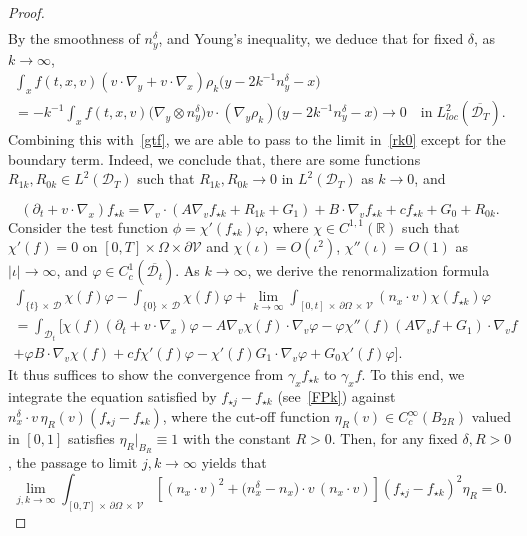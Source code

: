 \documentclass[AHL,Unicode,longabstracts,published]{cedram}
\newcommand*\p{\partial}
\newcommand*\R {\mathbb{R}}
\newcommand*\V {\mathcal{V}}
\newcommand*\D {\mathcal{D}}
\begin{document}
\begin{proof}
\begin{multline*}
\end{multline*}
By the smoothness of $n_y^\delta$, and Young's inequality, we deduce that for fixed $\delta$, as $k\rightarrow\infty$,
\begin{multline*}
\int_{x} f(t,x,v) (v\cdot\nabla_y + v\cdot\nabla_x) \rho_k\big(y-2k^{-1}n_y^\delta-x\big)\\
=-k^{-1}\! \int_{x}f(t,x,v) \big(\nabla_y\otimes n_y^\delta\big) v\cdot (\nabla_y\rho_k)\big(y-2k^{-1}n_y^\delta-x\big)\rightarrow0 \quad\text{in}\;L_{loc}^2(\overline{\D_T}).
\end{multline*}
Combining this with~\eqref{gtf}, we are able to pass to the limit in~\eqref{rk0} except for the boundary term. Indeed, we conclude that, there are some functions $R_{1k},R_{0k}\in L^2(\D_T)$ such that $R_{1k},R_{0k}\rightarrow 0$ in $L^2(\D_T)$ as $k\rightarrow0$, and

\begin{equation}\label{FPk}
(\p_t + v\cdot\nabla_x)f_{\star k} = \nabla_v\cdot\left(A\nabla_vf_{\star k}+R_{1k}+ G_1\right) + B\cdot\nabla_vf_{\star k} +cf_{\star k} +G_0 +R_{0k}.
\end{equation}
Consider the test function $\phi=\chi'(f_{\star k})\varphi$, where $\chi\in C^{1,1}(\R)$ such that $\chi'(f)=0$ on $[0,T]\times\Omega\times\p\V$ and $\chi(\iota)=O(\iota^2)$, $\chi''(\iota)=O(1)$ as $|\iota|\rightarrow\infty$, and $\varphi\in C^1_c(\overline{\D_t})$. As $k\rightarrow\infty$, we derive the renormalization formula
\begin{multline}\label{renk}
\int_{\{t\}\,\times\,\D} \chi(f)\varphi -\int_{\{0\}\,\times\,\D}\chi(f)\varphi + \lim_{k\rightarrow\infty}\int_{[0,t]\,\times\,\p\Omega\,\times\,\V} (n_x\cdot v) \chi(f_{\star k})\varphi\\
=\int_{\D_t} \big[\chi(f)(\p_t+v\cdot\nabla_x)\varphi-A\nabla_v\chi(f)\cdot\nabla_v\varphi -\varphi\chi''(f)(A\nabla_vf+G_1)\cdot\nabla_vf\\
+ \varphi B\cdot\nabla_v\chi(f) + cf\chi'(f)\varphi -\chi'(f)G_1\cdot\nabla_v\varphi + G_0\chi'(f)\varphi \big].
\end{multline}
It thus suffices to show the convergence from $\gamma_x f_{\star k}$ to $\gamma_x f$. To this end, we integrate the equation satisfied by $f_{\star j}-f_{\star k}$ (see~\eqref{FPk}) against $n_x^\delta\cdot v\,\eta_R(v)(f_{\star j}-f_{\star k})$, where the cut-off function $\eta_R(v)\in C_c^\infty(B_{2R})$ valued in $[0,1]$ satisfies $\eta_R|_{B_R}\equiv1$ with the constant $R>0$. Then, for any fixed $\delta,R>0$, the passage to limit $j,k\rightarrow\infty$ yields that
\begin{equation}\label{jk}
\lim_{j,k\rightarrow\infty}\int_{[0,T]\,\times\,\p\Omega\,\times\,\V}
\left[(n_x\cdot v)^2 + \big(n_x^\delta-n_x\big)\cdot v\,(n_x\cdot v) \right] \left(f_{\star j}-f_{\star k}\right)^2\eta_R = 0.
\end{equation}


\end{proof}
\end{document}
